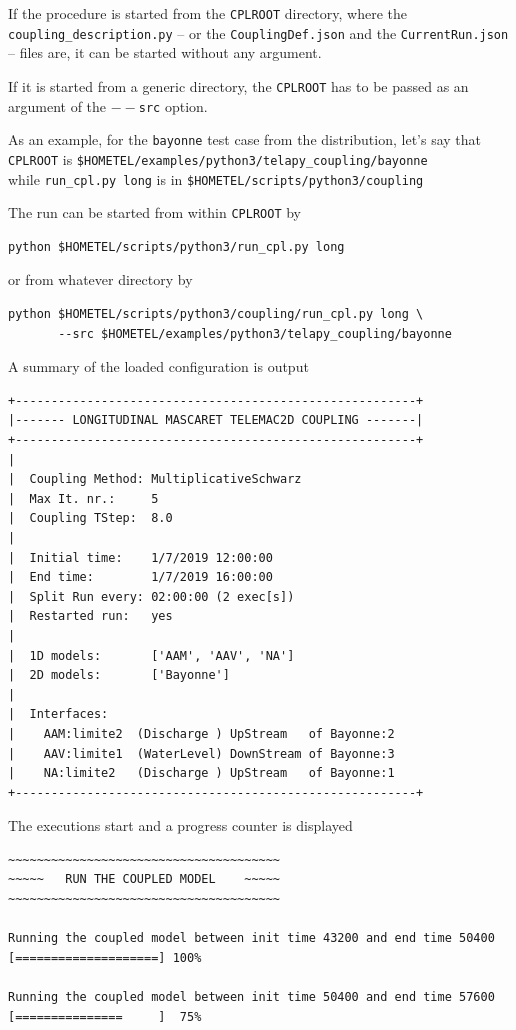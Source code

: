 \documentclass[Coupling]{../../data/TelemacDoc} %
\begin{document}
If the procedure is started from the \texttt{CPLROOT}
directory, where the \texttt{coupling\_description.py} -- or the \texttt{CouplingDef.json} and the
\texttt{CurrentRun.json} -- files are, it can be started without any
argument.

If it is started from a generic directory, the \texttt{CPLROOT} has to
be passed as an argument of the \texttt{$--$src} option.
\newline

As an example, for the \texttt{bayonne} test case from the
distribution, let's say that\\
\texttt{CPLROOT} is \texttt{\$HOMETEL/examples/python3/telapy\_coupling/bayonne}\\
while
\texttt{run\_cpl.py long} is in
\texttt{\$HOMETEL/scripts/python3/coupling}

The run can be started from within \texttt{CPLROOT} by
\begin{verbatim}
python $HOMETEL/scripts/python3/run_cpl.py long
\end{verbatim}
or from whatever directory by
\begin{verbatim}
python $HOMETEL/scripts/python3/coupling/run_cpl.py long \
       --src $HOMETEL/examples/python3/telapy_coupling/bayonne
\end{verbatim}


A summary of the loaded configuration is output
\begin{verbatim}
+--------------------------------------------------------+
|------- LONGITUDINAL MASCARET TELEMAC2D COUPLING -------|
+--------------------------------------------------------+
|
|  Coupling Method: MultiplicativeSchwarz
|  Max It. nr.:     5
|  Coupling TStep:  8.0
|
|  Initial time:    1/7/2019 12:00:00
|  End time:        1/7/2019 16:00:00
|  Split Run every: 02:00:00 (2 exec[s])
|  Restarted run:   yes
|
|  1D models:       ['AAM', 'AAV', 'NA']
|  2D models:       ['Bayonne']
|
|  Interfaces:
|    AAM:limite2  (Discharge ) UpStream   of Bayonne:2
|    AAV:limite1  (WaterLevel) DownStream of Bayonne:3
|    NA:limite2   (Discharge ) UpStream   of Bayonne:1
+--------------------------------------------------------+
\end{verbatim}

The executions start and a progress counter is displayed
\begin{verbatim}
~~~~~~~~~~~~~~~~~~~~~~~~~~~~~~~~~~~~~~
~~~~~   RUN THE COUPLED MODEL    ~~~~~
~~~~~~~~~~~~~~~~~~~~~~~~~~~~~~~~~~~~~~

Running the coupled model between init time 43200 and end time 50400
[====================] 100%

Running the coupled model between init time 50400 and end time 57600
[===============     ]  75%
\end{verbatim}
\end{document}
